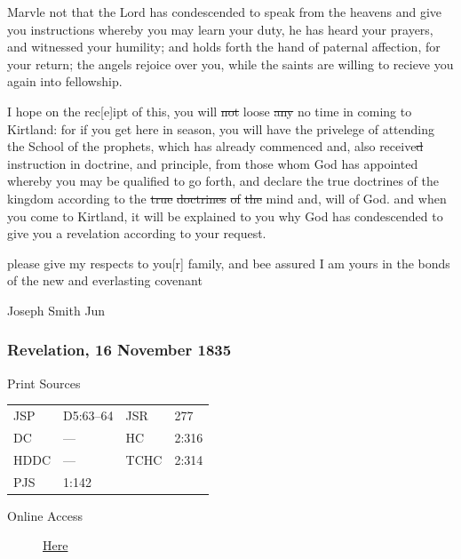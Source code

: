 				Marvle not that the Lord has condescended to speak from the heavens and give you instructions whereby you may learn your duty, he has heard your prayers, and witnessed your humility; and holds forth the hand of paternal affection, for your return; the angels rejoice over you, while the saints are willing to recieve you again into fellowship.

				I hope on the rec[e]ipt of this, you will \sout{not} loose \sout{any} no time in coming to Kirtland: for if you get here in season, you will have the privelege of attending the School of the prophets, which has already commenced and, also receive\sout{d} instruction in doctrine, and principle, from those whom God has appointed whereby you may be qualified to go forth, and declare the true doctrines of the kingdom according to the \sout{true} \sout{doctrines} \sout{of} \sout{the} mind and, will of God. and when you come to Kirtland, it will be explained to you why God has condescended to give you a revelation according to your request.

				please give my respects to you[r] family, and bee assured I am yours in the bonds of the new and everlasting covenant

				\begin{tightright}
				Joseph Smith Jun
				\end{tightright}
				
		\subsubsection{Revelation, 16 November 1835}
			\label{EMS-1835-JS-16-NOV-1835-REV}
			
			\begin{description}
				\item[Print Sources]
			\end{description}

				\begin{tabular}{p{0.5in}p{1in}p{0.5in}p{1in}}
				JSP	 	& D5:63--64		& JSR 		& 277 \\
				DC	 	& --- 			& HC 		& 2:316 \\
				HDDC 	& ---			& TCHC 		& 2:314 \\
				PJS 	& 1:142			& 	 		&  \\
				\end{tabular}
			
			\begin{description}
				\item[Online Access] \href{https://www.josephsmithpapers.org/paper-summary/revelation-16-november-1835/1}{Here}
			\end{description}
			
